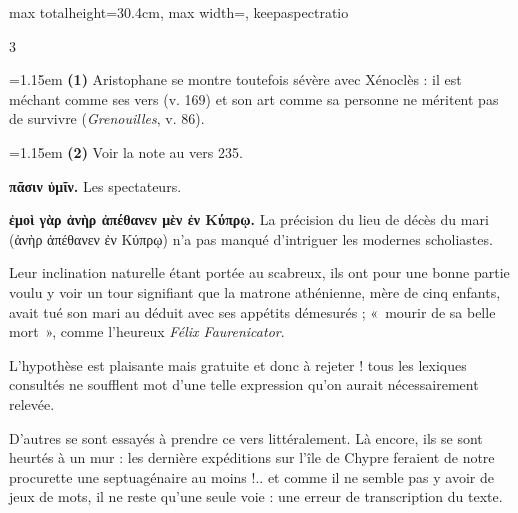\documentclass[11pt,twoside]{book}
\newcommand{\italique}[1]{\textit{#1}}
\begin{document}
\begin{adjustbox}{max totalheight=30.4cm, max width=\textwidth, keepaspectratio}
\begin{minipage}{\textwidth}
{\begin{multicols}{3}
\par\vspace{1.5pt}
\par\vspace{1.2pt}\par\nopagebreak\vspace{1pt}\noindent\hangindent=1.15em {\color{sepiaNote}\textbf{(1)}} Aristophane se montre toutefois sévère avec Xénoclès : il est méchant comme ses vers (v. 169) et son art comme sa personne ne méritent pas de survivre (\italique{Grenouilles}, v. 86).
\par\vspace{1.5pt}
\noindent\hangindent=1.15em {\color{sepiaNote}\textbf{(2)}} Voir la note au vers 235.
\par\vspace{1.5pt}
 \textbf{πᾶσιν ὑμῖν.} Les spectateurs.
\par\vspace{1.5pt}
 \textbf{ἐμοὶ γὰρ ἁνὴρ ἀπέθανεν μὲν ἐν Κύπρῳ.} La précision du lieu de décès du mari (ἁνὴρ ἀπέθανεν ἐν Κύπρῳ) n'a pas manqué d'intriguer les modernes scholiastes.
\par\vspace{1.5pt}
\noindent Leur inclination naturelle étant portée au scabreux, ils ont pour une bonne partie voulu y voir un tour signifiant que la matrone athénienne, mère de cinq enfants, avait tué son mari au déduit avec ses appétits démesurés ; «~mourir de sa belle mort~», comme l'heureux \italique{Félix Faurenicator}.
\par\vspace{1.5pt}
\noindent L'hypothèse est plaisante mais gratuite et donc à rejeter ! tous les lexiques consultés ne soufflent mot d'une telle expression qu'on aurait nécessairement relevée.
\par\vspace{1.5pt}
\noindent D'autres se sont essayés à prendre ce vers littéralement. Là encore, ils se sont heurtés à un mur : les dernière expéditions sur l'île de Chypre feraient de notre procurette une septuagénaire au moins !.. et comme il ne semble pas y avoir de jeux de mots, il ne reste qu'une seule voie : une erreur de transcription du texte.
\par\vspace{1.5pt}

\end{multicols}}
\end{minipage}
\end{adjustbox}
\end{document}
